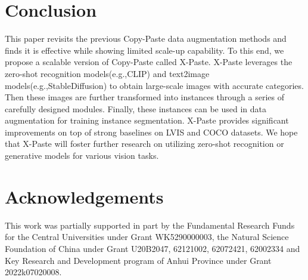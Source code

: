 \documentclass{article}
\newcommand{\eg}{e.g.,}
\begin{document}
\section{Conclusion}
This paper revisits the previous Copy-Paste data augmentation methods and finds it is effective while showing limited scale-up capability. To this end, we propose a scalable version of Copy-Paste called X-Paste. X-Paste leverages the zero-shot recognition models(\eg CLIP) and text2image models(\eg StableDiffusion) to obtain large-scale images with accurate categories. Then these images are further transformed into instances through a series of carefully designed modules. Finally, these instances can be used in data augmentation for training instance segmentation. X-Paste provides significant improvements on top of strong baselines on LVIS and COCO datasets. We hope that X-Paste will foster further research on utilizing zero-shot recognition or generative models for various vision tasks.

\section{Acknowledgements}
This work was partially supported in part by the Fundamental Research Funds for the Central Universities under Grant WK5290000003, the Natural Science Foundation of China under Grant U20B2047, 62121002, 62072421, 62002334 and Key Research and Development program of Anhui Province under Grant 2022k07020008. 



\end{document}
